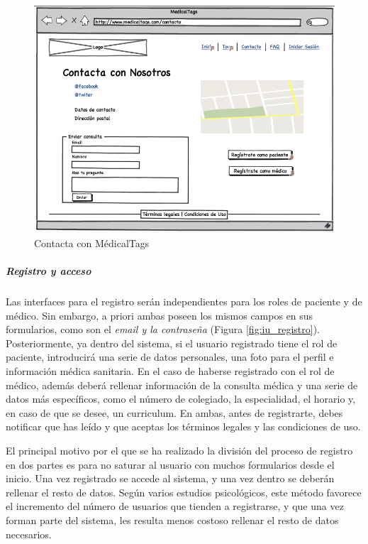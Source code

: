 		
		\begin{figure}[H]
		  \centering
		    \includegraphics[width=12cm]{img/png/interfaz/6_Contacto.png}
		  \caption{Contacta con MédicalTags}
		  \label{fig:iu_contacto}
		\end{figure}
	
			
	
		\subparagraph{Registro y acceso} %
			\label{par:registro_y_acceso}
	
			Las interfaces para el registro serán independientes para los roles de paciente y de médico. Sin embargo, a priori ambas poseen los mismos campos en sus formularios, como son el \textit{email y la contraseña} (Figura \ref{fig:iu_registro}). Posteriormente, ya dentro del sistema, si el usuario registrado tiene el rol de paciente, introducirá una serie de datos personales, una foto para el perfil e información médica sanitaria. En el caso de haberse registrado con el rol de médico, además deberá rellenar información de la consulta médica y una serie de datos más específicos, como el número de colegiado, la especialidad, el horario y, en caso de que se desee, un curriculum. En ambas, antes de registrarte, debes notificar que has leído y que aceptas los términos legales y las condiciones de uso. 
			
			El principal motivo por el que se ha realizado la división del proceso de registro en dos partes es para no saturar al usuario con muchos formularios desde el inicio. Una vez registrado se accede al sistema, y una vez dentro se deberán rellenar el resto de datos. Según varios estudios psicológicos, este método favorece el incremento del número de usuarios que tienden a registrarse, y que una vez forman parte del sistema, les resulta menos costoso rellenar el resto de datos necesarios.
			
